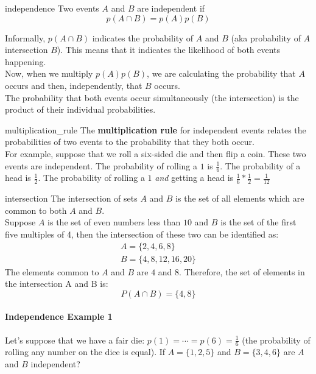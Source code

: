 \documentclass{mlnotes}
\begin{document}
\begin{definition}{}{independence}
  Two events \(A\) and \(B\) are independent if
  \[
    p(A \cap B) = p(A)p(B) 
  \]

  Informally, \(p(A \cap B)\) indicates the probability of \(A\) and \(B\) (aka
  probability of \(A\) intersection \(B\)). This means that it indicates the
  likelihood of both events happening.
  \\[12pt]
  Now, when we multiply \(p(A)p(B)\), we are calculating the probability that
  \(A\) occurs and then, independently, that \(B\) occurs. 
  \\[12pt]
  The probability that both events occur simultaneously (the intersection) is
  the product of their individual probabilities.

  \begin{definition}{}{multiplication_rule}
    The \textbf{multiplication rule} for independent events relates the
    probabilities of two events to the probability that they both occur. 
    \\[12pt]
    For example, suppose that we roll a six-sided die and then flip a coin.
    These two events are independent. The probability of rolling a \(1\) is
    \(\frac{1}{6}\). The probability of a head is \(\frac{1}{2}\). The
    probability of rolling a \(1\) \emph{and} getting a head is \(\frac{1}{6} * \frac{1}{2} = \frac{1}{12}\)
  \end{definition}
  
  \begin{definition}{}{intersection}
    The intersection of sets \(A\) and \(B\) is the set of all elements which
    are common to both \(A\) and \(B\).
    \\[12pt]
    Suppose \(A\) is the set of even numbers less than \(10\) and \(B\) is the
    set of the first five multiples of 4, then the intersection of these two can
    be identified as:
    \begin{align}
      A = \{2,4,6,8\}\\
      B = \{4,8,12,16,20\}
    \end{align}
    The elements common to \(A\) and \(B\) are \(4\) and \(8\). Therefore, the
    set of elements in the intersection A and B is:
    \[
      P(A \cap B) = \{4,8\}
    \]
  \end{definition}
\end{definition}
\vspace{12pt}
\paragraph{Independence Example 1}
Let's suppose that we have a fair die: \(p(1) = \cdots = p(6) = \frac{1}{6}\) (the
probability of rolling any number on the dice is equal). If \(A = \{1,2,5\}\)
and \(B = \{3,4,6\}\) are \(A\) and \(B\) independent?
\end{document}
